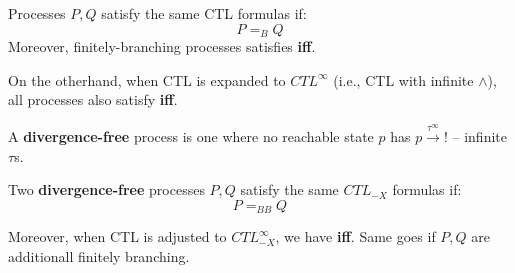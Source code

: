 \documentclass[99-notes-packed.tex]{subfiles}
\begin{document}
\begin{theorem}
    Processes $P, Q$ satisfy the same CTL formulas if: 
    \begin{equation*}
        P =_{B} Q
    \end{equation*}
    Moreover, finitely-branching processes satisfies \textbf{iff}. 

    On the otherhand, when CTL is expanded to $CTL^{\infty}$ (i.e., CTL with infinite $\wedge$), all processes also satisfy \textbf{iff}. 
\end{theorem}

\begin{theorem}
    A \textbf{divergence-free} process is one where no reachable state $p$ has $p \xrightarrow{\tau^\infty} !$ -- infinite $\tau$s. 
    
    Two \textbf{divergence-free} processes $P, Q$ satisfy the same ${CTL}_{-X}$ formulas if: 
    \begin{equation*}
        P =_{BB} Q
    \end{equation*}

    Moreover, when CTL is adjusted to ${CTL}^{\infty}_{-X}$, we have \textbf{iff}. Same goes if $P, Q$ are additionall finitely branching. 
\end{theorem}
\end{document}
